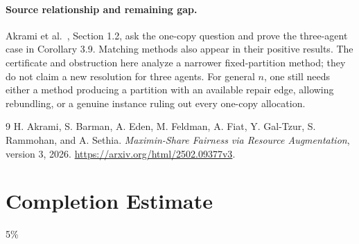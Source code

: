 \documentclass[11pt]{article}
\theoremstyle{definition}
\theoremstyle{remark}
\begin{document}
\paragraph{Source relationship and remaining gap.}
Akrami et al.~\cite{source}, Section 1.2, ask the one-copy question and prove the three-agent case in Corollary 3.9. Matching methods also appear in their positive results. The certificate and obstruction here analyze a narrower fixed-partition method; they do not claim a new resolution for three agents. For general $n$, one still needs either a method producing a partition with an available repair edge, allowing rebundling, or a genuine instance ruling out every one-copy allocation.

\begin{thebibliography}{9}
 H. Akrami, S. Barman, A. Eden, M. Feldman, A. Fiat,
Y. Gal-Tzur, S. Rammohan, and A. Sethia.
\emph{Maximin-Share Fairness via Resource Augmentation}, version 3, 2026.
\url{https://arxiv.org/html/2502.09377v3}.
\end{thebibliography}

\section{Completion Estimate}
5\%
\end{document}
